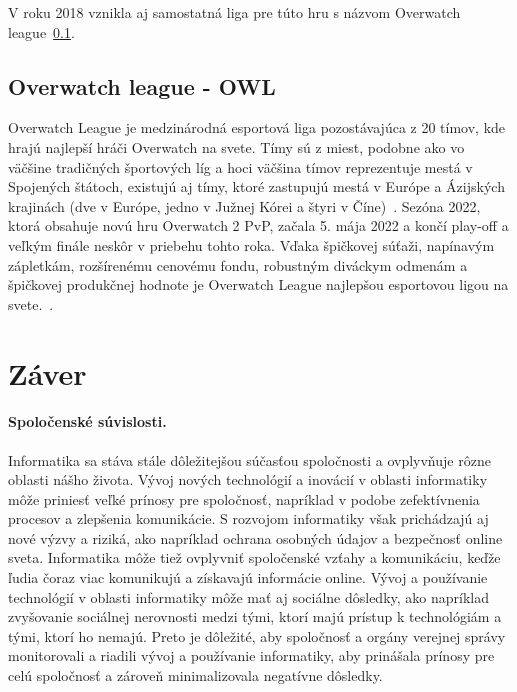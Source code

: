 \documentclass[10pt,oneside,slovak,a4paper]{article}
\begin{document}
V roku 2018 vznikla aj samostatná liga pre túto hru s názvom Overwatch league~\ref{Overwatch league - OWL}.

\subsection{Overwatch league - OWL} \label{Overwatch league - OWL}

Overwatch League je medzinárodná esportová liga pozostávajúca z 20 tímov, kde hrajú najlepší hráči Overwatch na svete. Tímy sú z miest, podobne ako vo väčšine tradičných športových líg a hoci väčšina tímov reprezentuje mestá v Spojených štátoch, existujú aj tímy, ktoré zastupujú mestá v Európe a Ázijských krajinách (dve v Európe, jedno v Južnej Kórei a štyri v Číne)~\cite{Overwatchesport}. Sezóna 2022, ktorá obsahuje novú hru Overwatch 2 PvP, začala 5. mája 2022 a končí play-off a veľkým finále neskôr v priebehu tohto roka. Vďaka špičkovej súťaži, napínavým zápletkám, rozšírenému cenovému fondu, robustným diváckym odmenám a špičkovej produkčnej hodnote je Overwatch League najlepšou esportovou ligou na svete.~\cite{Overwatchsite}.



\section{Záver} \label{zaver} %



\paragraph{Spoločenské súvislosti.}

Informatika sa stáva stále dôležitejšou súčasťou spoločnosti a ovplyvňuje rôzne oblasti nášho života.
Vývoj nových technológií a inovácií v oblasti informatiky môže priniesť veľké prínosy pre spoločnosť, napríklad v podobe zefektívnenia procesov a zlepšenia komunikácie. S rozvojom informatiky však prichádzajú aj nové výzvy a riziká, ako napríklad ochrana osobných údajov a bezpečnosť online sveta.
Informatika môže tiež ovplyvniť spoločenské vzťahy a komunikáciu, keďže ľudia čoraz viac komunikujú a získavajú informácie online.
Vývoj a používanie technológií v oblasti informatiky môže mať aj sociálne dôsledky, ako napríklad zvyšovanie sociálnej nerovnosti medzi tými, ktorí majú prístup k technológiám a tými, ktorí ho nemajú. Preto je dôležité, aby spoločnosť a orgány verejnej správy monitorovali a riadili vývoj a používanie informatiky, aby prinášala prínosy pre celú spoločnosť a zároveň minimalizovala negatívne dôsledky.
\end{document}
